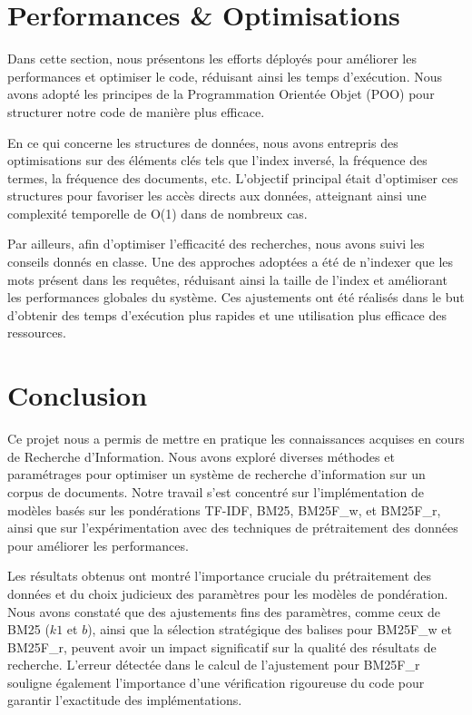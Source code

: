 \documentclass[a4paper, 12pt]{article}
\begin{document}
\newpage


\section{Performances \& Optimisations}

Dans cette section, nous présentons les efforts déployés pour améliorer les performances et optimiser le code, réduisant ainsi les temps d'exécution.
Nous avons adopté les principes de la Programmation Orientée Objet (POO) pour structurer notre code de manière plus efficace.

En ce qui concerne les structures de données, nous avons entrepris des optimisations sur des éléments clés tels que l'index inversé, la fréquence des termes,
la fréquence des documents, etc. L'objectif principal était d'optimiser ces structures pour favoriser les accès directs aux données,
atteignant ainsi une complexité temporelle de O(1) dans de nombreux cas.

Par ailleurs, afin d'optimiser l'efficacité des recherches, nous avons suivi les conseils donnés en classe. Une des approches adoptées a été de n'indexer 
que les mots présent dans les requêtes, réduisant ainsi la taille de l'index et améliorant les performances globales du système. Ces ajustements ont été réalisés 
dans le but d'obtenir des temps d'exécution plus rapides et une utilisation plus efficace des ressources.


\section{Conclusion}
Ce projet nous a permis de mettre en pratique les connaissances acquises en cours de Recherche d'Information. Nous avons exploré diverses méthodes et paramétrages pour optimiser un système de recherche d'information sur un corpus de documents. Notre travail s'est concentré sur l'implémentation de modèles basés sur les pondérations TF-IDF, BM25, BM25F_w, et BM25F_r, ainsi que sur l'expérimentation avec des techniques de prétraitement des données pour améliorer les performances.

Les résultats obtenus ont montré l'importance cruciale du prétraitement des données et du choix judicieux des paramètres pour les modèles de pondération. Nous avons constaté que des ajustements fins des paramètres, comme ceux de BM25 (\(k1\) et \(b\)), ainsi que la sélection stratégique des balises pour BM25F_w et BM25F_r, peuvent avoir un impact significatif sur la qualité des résultats de recherche. L'erreur détectée dans le calcul de l'ajustement pour BM25F_r souligne également l'importance d'une vérification rigoureuse du code pour garantir l'exactitude des implémentations.
\end{document}
